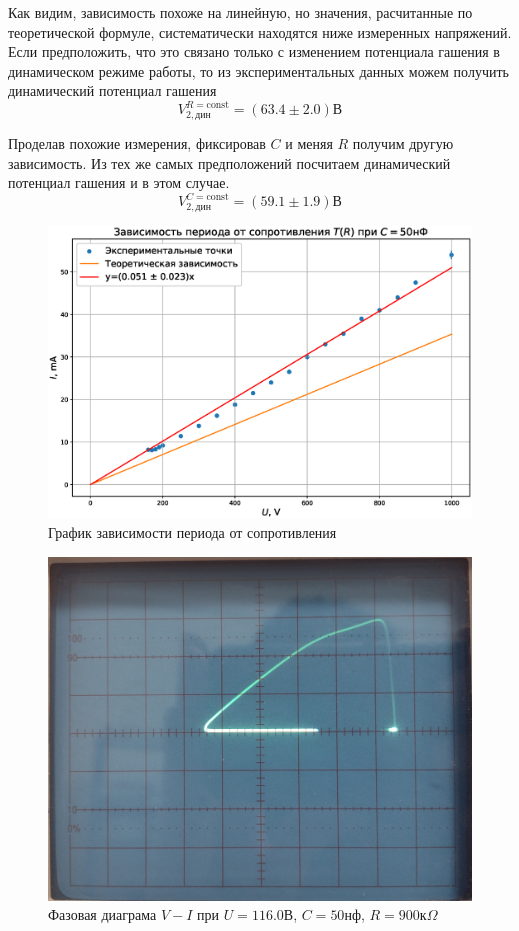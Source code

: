 \documentclass{article}
\begin{document}
Как видим, зависимость похоже на линейную, но значения, расчитанные по теоретической
формуле, систематически находятся ниже измеренных напряжений. Если предположить, что
это связано только с изменением потенциала гашения в динамическом режиме работы, то
из экспериментальных данных можем получить динамический потенциал гашения
\begin{equation*}
    V_{2, дин}^{R=\text{const}} = (63.4 \pm 2.0) В
\end{equation*}

Проделав похожие измерения, фиксировав $C$ и меняя $R$ получим другую зависимость. Из
тех же самых предположений посчитаем динамический потенциал гашения и в этом случае.
\begin{equation*}
    V_{2, дин}^{C=\text{const}} = (59.1 \pm 1.9) В
\end{equation*}

\newpage
\begin{figure}[h]
    \center\includegraphics[width = \linewidth]{T_R}
    \caption{График зависимости периода от сопротивления}
\end{figure}
\begin{figure}[h]
    \center\includegraphics[width = 0.49\linewidth]{phase_diagram}
    \caption{Фазовая диаграма $V-I$ при $U=116.0В$, $C=50нф$, $R=900к\Omega$}
\end{figure}
\end{document}
